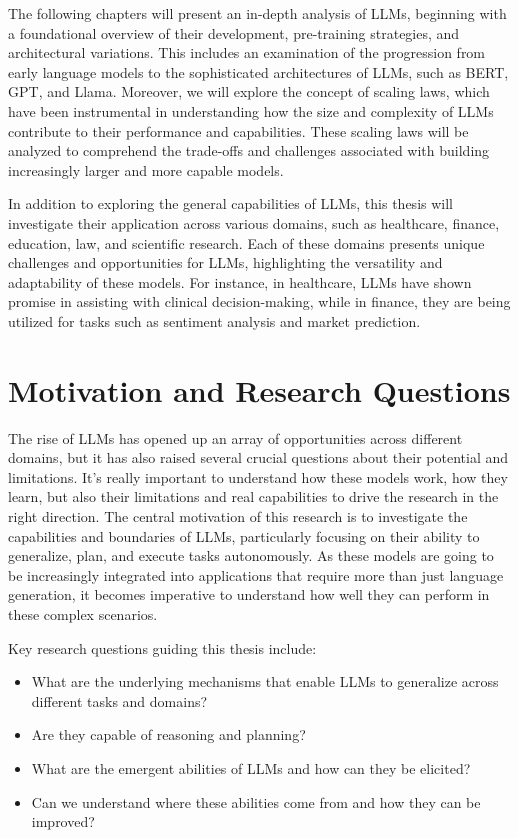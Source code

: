 The following chapters will present an in-depth analysis of LLMs, beginning with a foundational overview of their development, pre-training strategies, and architectural variations.
This includes an examination of the progression from early language models to the sophisticated architectures of LLMs, such as BERT, GPT, and Llama.
Moreover, we will explore the concept of scaling laws, which have been instrumental in understanding how the size and complexity of LLMs contribute to their performance and capabilities.
These scaling laws will be analyzed to comprehend the trade-offs and challenges associated with building increasingly larger and more capable models.

In addition to exploring the general capabilities of LLMs, this thesis will investigate their application across various domains, such as healthcare, finance, education, law, and scientific research.
Each of these domains presents unique challenges and opportunities for LLMs, highlighting the versatility and adaptability of these models.
For instance, in healthcare, LLMs have shown promise in assisting with clinical decision-making, while in finance, they are being utilized for tasks such as sentiment analysis and market prediction.


\section*{Motivation and Research Questions}
The rise of LLMs has opened up an array of opportunities across different domains, but it has also raised several crucial questions about their potential and limitations.
It's really important to understand how these models work, how they learn, but also their limitations and real capabilities to drive the research in the right direction.
The central motivation of this research is to investigate the capabilities and boundaries of LLMs, particularly focusing on their ability to generalize, plan, and execute tasks autonomously.
As these models are going to be increasingly integrated into applications that require more than just language generation, it becomes imperative to understand how well they can perform in these complex scenarios.

\noindent Key research questions guiding this thesis include:

\begin{itemize}
	\item What are the underlying mechanisms that enable LLMs to generalize across different tasks and domains?
	\item Are they capable of reasoning and planning?
	\item What are the emergent abilities of LLMs and how can they be elicited?
	\item Can we understand where these abilities come from and how they can be improved?
\end{itemize}

